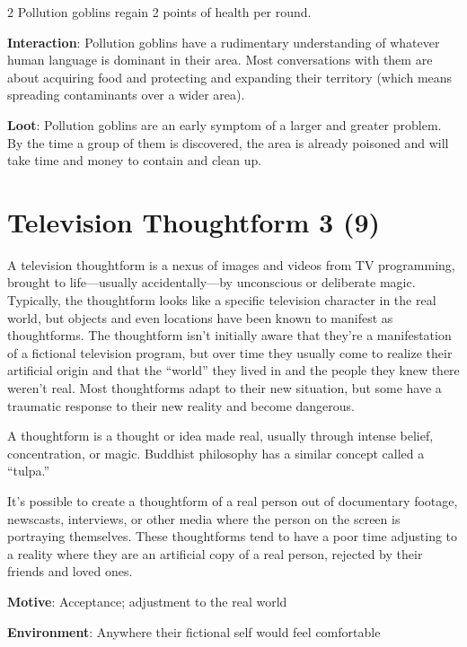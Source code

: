 \begin{multicols}{2}
Pollution goblins regain 2 points of health per round. 

\textbf{Interaction}: Pollution goblins have a rudimentary understanding of whatever human language is dominant in their area. Most conversations with them are about acquiring food and protecting and expanding their territory (which means spreading contaminants over a wider area). 

\textbf{Loot}: Pollution goblins are an early symptom of a larger and greater problem. By the time a group of them is discovered, the area is already poisoned and will take time and money to contain and clean up. 

\section{Television Thoughtform 3 (9)}

A television thoughtform is a nexus of images and videos from TV programming, brought to life—usually accidentally—by unconscious or deliberate magic. Typically, the thoughtform looks like a specific television character in the real world, but objects and even locations have been known to manifest as thoughtforms. The thoughtform isn’t initially aware that they’re a manifestation of a fictional television program, but over time they usually come to realize their artificial origin and that the “world” they lived in and the people they knew there weren’t real. Most thoughtforms adapt to their new situation, but some have a traumatic response to their new reality and become dangerous.

A thoughtform is a thought or idea made real, usually through intense belief, concentration, or magic. Buddhist philosophy has a similar concept called a “tulpa.”

It’s possible to create a thoughtform of a real person out of documentary footage, newscasts, interviews, or other media where the person on the screen is portraying themselves. These thoughtforms tend to have a poor time adjusting to a reality where they are an artificial copy of a real person, rejected by their friends and loved ones.

\textbf{Motive}: Acceptance; adjustment to the real world 

\textbf{Environment}: Anywhere their fictional self would feel comfortable 


\end{multicols}
